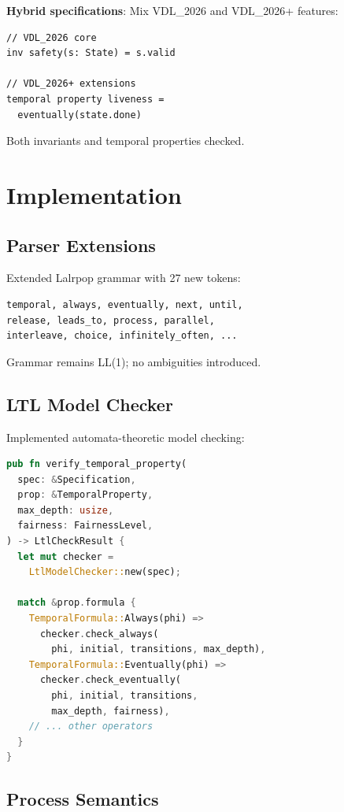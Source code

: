\documentclass[conference]{IEEEtran}
\begin{document}
\textbf{Hybrid specifications}: Mix VDL\_2026 and VDL\_2026+ features:

\begin{lstlisting}[caption={Hybrid specification}]
// VDL_2026 core
inv safety(s: State) = s.valid

// VDL_2026+ extensions
temporal property liveness =
  eventually(state.done)
\end{lstlisting}

Both invariants and temporal properties checked.

\section{Implementation}
\label{sec:implementation}

\subsection{Parser Extensions}

Extended Lalrpop grammar with 27 new tokens:

\begin{verbatim}
temporal, always, eventually, next, until,
release, leads_to, process, parallel,
interleave, choice, infinitely_often, ...
\end{verbatim}

Grammar remains LL(1); no ambiguities introduced.

\subsection{LTL Model Checker}

Implemented automata-theoretic model checking:

\begin{lstlisting}[language=Rust, caption={LTL checking integration}]
pub fn verify_temporal_property(
  spec: &Specification,
  prop: &TemporalProperty,
  max_depth: usize,
  fairness: FairnessLevel,
) -> LtlCheckResult {
  let mut checker =
    LtlModelChecker::new(spec);

  match &prop.formula {
    TemporalFormula::Always(phi) =>
      checker.check_always(
        phi, initial, transitions, max_depth),
    TemporalFormula::Eventually(phi) =>
      checker.check_eventually(
        phi, initial, transitions,
        max_depth, fairness),
    // ... other operators
  }
}
\end{lstlisting}

\subsection{Process Semantics}
\end{document}
